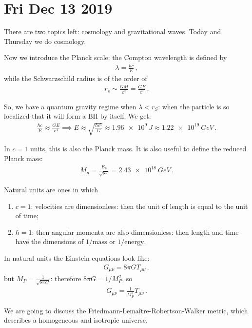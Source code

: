 \documentclass[main.tex]{subfiles}
\begin{document}
\section*{Fri Dec 13 2019}

There are two topics left: cosmology and gravitational waves. 
Today and Thursday we do cosmology. 

Now we introduce the Planck scale: the Compton wavelength is defined by  
%
\begin{align}
  \lambda = \frac{\hbar c }{E}
\,,
\end{align}
%
while the Schwarzschild radius is of the order of 
%
\begin{align}
  r_s \sim \frac{GM}{c^2} = \frac{GE}{c^{4}}
\,.
\end{align}

So, we have a quantum gravity regime when \(\lambda < r_S\): when the particle is so localized that it will form a BH by itself. We get: 
%
\begin{align}
  \frac{\hbar c}{E} \approx \frac{GE}{c^{4}} \implies
  E \approx \sqrt{\frac{\hbar c^{5}}{G}} \approx \SI{1.96e9}{J} \approx \SI{1.22e19}{GeV}
\,.
\end{align}

In \(c=1\) units, this is also the Planck mass.
It is also useful to define the reduced Planck mass:
%
\begin{align}
  M_p = \frac{E_p}{\sqrt{8 \pi }} = \SI{2.43e18}{GeV}
\,.
\end{align}

Natural units are ones in which 
\begin{enumerate}
    \item \(c=1\): velocities are dimensionless: then the unit of length is equal to the unit of time; 
    \item \(\hbar = 1\): then angular momenta are also dimensionless: then length and time have the dimensions of \(1/\text{mass}\) or \(1/\text{energy}\). 
\end{enumerate}

In natural units the Einstein equations look like: 
%
\begin{align}
  G_{\mu \nu } = 8 \pi G T_{\mu \nu }
\,,
\end{align}
%
but \(M_P = \frac{1}{\sqrt{8 \pi G}}\): therefore \(8 \pi G = 1 / M_P^2\), so 
%
\begin{align}
  G_{\mu \nu } = \frac{1}{M_P^2} T_{\mu \nu }
\,.
\end{align}

We are going to discuss the Friedmann-Lemaître-Robertson-Walker metric, which describes a homogeneous and isotropic universe. 
\end{document}

